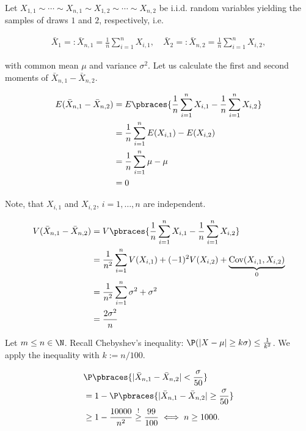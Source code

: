\begin{solution}

Let $X_{1, 1} \sim \cdots \sim X_{n, 1} \sim X_{1, 2} \sim \cdots \sim X_{n, 2}$ be i.i.d. random variables yielding the samples of draws $1$ and $2$, respectively, i.e.

\begin{align*}
    \bar X_1 =: \bar X_{n, 1} = \frac{1}{n} \sum_{i=1}^n X_{i, 1},
    \quad
    \bar X_2 =: \bar X_{n, 2} = \frac{1}{n} \sum_{i=1}^n X_{i, 2},
\end{align*}

with common mean $\mu$ and variance $\sigma^2$.
Let us calculate the first and second moments of $\bar X_{n, 1} - \bar X_{n, 2}$.

\begin{align*}
    E(\bar X_{n, 1} - \bar X_{n, 2})
    & =
    E
    \pbraces
    {
        \frac{1}{n}
        \sum_{i=1}^n
            X_{i, 1}
            -
        \frac{1}{n}
        \sum_{i=1}^n
            X_{i, 2}
    } \\
    & =
    \frac{1}{n}
    \sum_{i=1}^n
        E(X_{i, 1}) - E(X_{i, 2}) \\
    & =
    \frac{1}{n}
    \sum_{i=1}^n
        \mu - \mu \\
    & =
    0
\end{align*}

Note, that $X_{i, 1}$ and $X_{i, 2}$, $i = 1, \dots, n$ are independent.

\begin{align*}
    V(\bar X_{n, 1} - \bar X_{n, 2})
    & =
    V
    \pbraces
    {
        \frac{1}{n}
        \sum_{i=1}^n
            X_{i, 1}
            -
        \frac{1}{n}
        \sum_{i=1}^n
            X_{i, 2}
    } \\
    & =
    \frac{1}{n^2}
    \sum_{i=1}^n
        V(X_{i, 1}) + (-1)^2 V(X_{i, 2}) + \underbrace{\operatorname{Cov}(X_{i, 1}, X_{i, 2})}_0 \\
    & =
    \frac{1}{n^2}
    \sum_{i=1}^n
        \sigma^2 + \sigma^2 \\
    & =
    \frac{2 \sigma^2}{n}
\end{align*}

Let $m \leq n \in \N$.
Recall Chebyshev's inequality: $\P(|X - \mu| \geq k \sigma)  \leq \frac{1}{k^2}$.
We apply the inequality with $k := n/100$.

\begin{align*}
    &\P \pbraces{|\bar X_{n, 1} - \bar X_{n, 2}| < \frac{\sigma}{50}} \\
    & = 1 - \P\pbraces{|\bar X_{n, 1} - \bar X_{n, 2}| \geq \frac{\sigma}{50}} \\
    &\geq 1 - \frac{10000}{n^2} \stackrel{!}{\geq} \frac{99}{100}
    \iff n \geq 1000.
\end{align*}

\end{solution}

